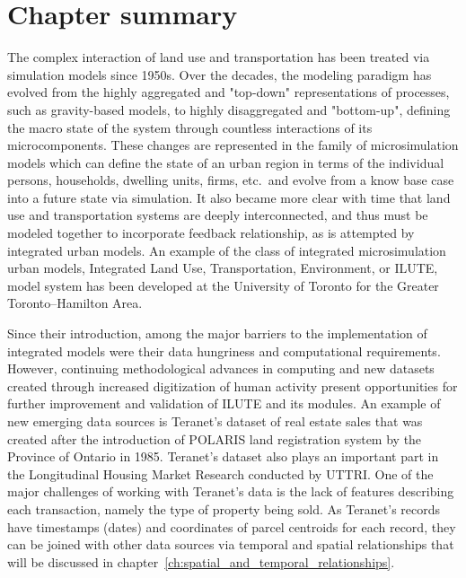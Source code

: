 \section{Chapter summary} \label{sec:background_summary}

The complex interaction of land use and transportation has been treated via simulation models since 1950s.
Over the decades, the modeling paradigm has evolved from the highly aggregated and "top-down" representations of processes, such as gravity-based models, to highly disaggregated and "bottom-up", defining the macro state of the system through countless interactions of its microcomponents.
These changes are represented in the family of microsimulation models which can define the state of an urban region in terms of the individual persons, households, dwelling units, firms, etc.\ and evolve from a know base case into a future state via simulation.
It also became more clear with time that land use and transportation systems are deeply interconnected, and thus must be modeled together to incorporate feedback relationship, as is attempted by integrated urban models.
An example of the class of integrated microsimulation urban models, Integrated Land Use, Transportation, Environment, or ILUTE, model system has been developed at the University of Toronto for the Greater Toronto--Hamilton Area.

Since their introduction, among the major barriers to the implementation of integrated models were their data hungriness and computational requirements.
However, continuing methodological advances in computing and new datasets created through increased digitization of human activity present opportunities for further improvement and validation of ILUTE and its modules.
An example of new emerging data sources is Teranet's dataset of real estate sales that was created after the introduction of POLARIS land registration system by the Province of Ontario in 1985.
Teranet's dataset also plays an important part in the Longitudinal Housing Market Research conducted by UTTRI.
One of the major challenges of working with Teranet's data is the lack of features describing each transaction, namely the type of property being sold.
As Teranet's records have timestamps (dates) and coordinates of parcel centroids for each record, they can be joined with other data sources via temporal and spatial relationships that will be discussed in chapter~\ref{ch:spatial_and_temporal_relationships}.
